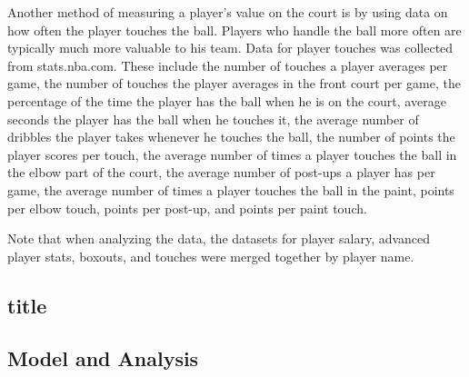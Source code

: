 \documentclass[12pt]{article}
\begin{document}
	Another method of measuring a player's value on the court is by using data on how often the player touches the ball. Players who handle the ball more often are typically much more valuable to his team. Data for player touches was collected from stats.nba.com. These include the number of touches a player averages per game, the number of touches the player averages in the front court per game, the percentage of the time the player has the ball when he is on the court, average seconds the player has the ball when he touches it, the average number of dribbles the player takes whenever he touches the ball, the number of points the player scores per touch, the average number of times a player touches the ball in the elbow part of the court, the average number of post-ups a player has per game, the average number of times a player touches the ball in the paint, points per elbow touch, points per post-up, and points per paint touch. 

	Note that when analyzing the data, the datasets for player salary, advanced player stats, boxouts, and touches were merged together by player name. 
	
	\subsection{title}
	
	\subsection{Model and Analysis}
	
\end{document}

